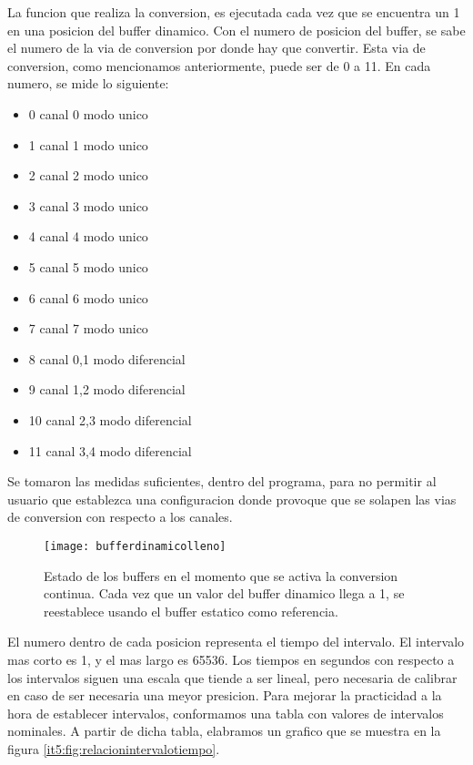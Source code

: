 La funcion que realiza la conversion, es ejecutada cada vez que se encuentra un 1 en una posicion del buffer dinamico. Con el numero de posicion del buffer, se sabe el numero de la via de conversion por donde hay que convertir. Esta via de conversion, como mencionamos anteriormente, puede ser de 0 a 11. En cada numero, se mide lo siguiente:

\begin{itemize}
\item 0 \textrightarrow  canal 0 modo unico
\item 1 \textrightarrow  canal 1 modo unico
\item 2 \textrightarrow  canal 2 modo unico
\item 3 \textrightarrow  canal 3 modo unico
\item 4 \textrightarrow  canal 4 modo unico
\item 5 \textrightarrow  canal 5 modo unico
\item 6 \textrightarrow  canal 6 modo unico
\item 7 \textrightarrow  canal 7 modo unico
\item 8 \textrightarrow  canal 0,1 modo diferencial
\item 9 \textrightarrow  canal 1,2 modo diferencial
\item 10 \textrightarrow  canal 2,3 modo diferencial
\item 11 \textrightarrow  canal 3,4 modo diferencial
\end{itemize}

Se tomaron las medidas suficientes, dentro del programa, para no permitir al usuario que establezca una configuracion donde provoque que se solapen las vias de conversion con respecto a los canales. 

\begin{figure}[h]
  \centering
  \texttt{[image: bufferdinamicolleno]}
  \caption{Estado de los buffers en el momento que se activa la conversion continua. Cada vez que un valor del buffer dinamico llega a 1, se reestablece usando el buffer estatico como referencia.}\label{it5:fig:bufferdinamicolleno}
\end{figure}

El numero dentro de cada posicion representa el tiempo del intervalo. El intervalo mas corto es 1, y el mas largo es 65536. Los tiempos en segundos con respecto a los intervalos siguen una escala que tiende a ser lineal, pero necesaria de calibrar en caso de ser necesaria una meyor presicion. Para mejorar la practicidad a la hora de establecer intervalos, conformamos una tabla con valores de intervalos nominales. A partir de dicha tabla, elabramos un grafico que se muestra en la figura \ref{it5:fig:relacionintervalotiempo}.

